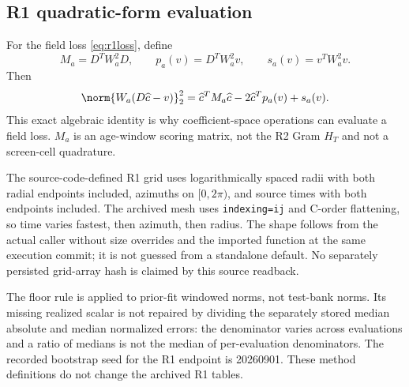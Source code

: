 \subsection{R1 quadratic-form evaluation}
For the field loss \eqref{eq:r1loss}, define
\begin{equation}
M_a=D^TW_a^2D,\qquad p_a(v)=D^TW_a^2v,\qquad s_a(v)=v^TW_a^2v.
\end{equation}
Then
\begin{equation}
\norm{W_a(D\widehat c-v)}_2^2
=\widehat c^TM_a\widehat c-2\widehat c^Tp_a(v)+s_a(v).
\label{eq:quadraticloss}
\end{equation}
This exact algebraic identity is why coefficient-space operations can evaluate a field loss. $M_a$ is an age-window scoring matrix, not the R2 Gram $H_T$ and not a screen-cell quadrature.

The source-code-defined R1 grid uses logarithmically spaced radii with both radial endpoints included, azimuths on $[0,2\pi)$, and source times with both endpoints included. The archived mesh uses \texttt{indexing=ij} and C-order flattening, so time varies fastest, then azimuth, then radius. The shape follows from the actual caller without size overrides and the imported function at the same execution commit; it is not guessed from a standalone default. No separately persisted grid-array hash is claimed by this source readback.

The floor rule is applied to prior-fit windowed norms, not test-bank norms. Its missing realized scalar is not repaired by dividing the separately stored median absolute and median normalized errors: the denominator varies across evaluations and a ratio of medians is not the median of per-evaluation denominators. The recorded bootstrap seed for the R1 endpoint is 20260901. These method definitions do not change the archived R1 tables.

